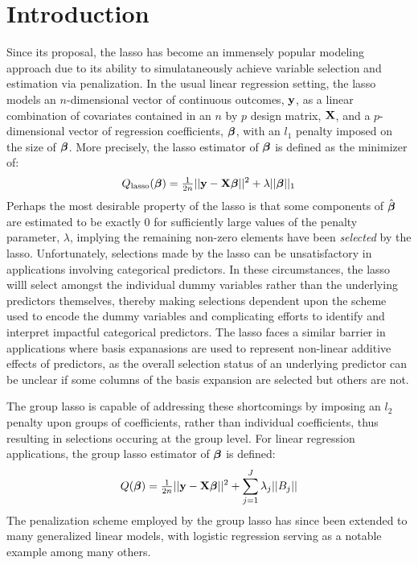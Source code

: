 \section{Introduction}

Since its proposal, the lasso \citep{tibshirani_1996} has become an immensely popular modeling approach due to its ability to simulataneously achieve variable selection and estimation via penalization. In the usual linear regression setting, the lasso models an $n$-dimensional vector of continuous outcomes, $\mathbf{y}$, as a linear combination of covariates contained in an $n$ by $p$ design matrix, $\mathbf{X}$, and a $p$-dimensional vector of regression coefficients, $\boldsymbol{\beta}$, with an $l_1$ penalty imposed on the size of $\boldsymbol{\beta}$. More precisely, the lasso estimator of $\boldsymbol{\beta}$ is defined as the minimizer of:
\begin{equation*}
Q_{\text{lasso}}(\boldsymbol{\beta}) = \tfrac{1}{2n}||\mathbf{y} - \mathbf{X}\boldsymbol{\beta}||^2 + \lambda||\boldsymbol{\beta}||_1
\end{equation*}
Perhaps the most desirable property of the lasso is that some components of $\hat{\boldsymbol{\beta}}$ are estimated to be exactly 0 for sufficiently large values of the penalty parameter, $\lambda$, implying the remaining non-zero elements have been \textit{selected} by the lasso.  Unfortunately, selections made by the lasso can be unsatisfactory in applications involving categorical predictors.  In these circumstances, the lasso willl select amongst the individual dummy variables rather than the underlying predictors themselves, thereby making selections dependent upon the scheme used to encode the dummy variables and complicating efforts to identify and interpret impactful categorical predictors.  The lasso faces a similar barrier in applications where basis expanasions are used to represent non-linear additive effects of predictors, as the overall selection status of an underlying predictor can be unclear if some columns of the basis expansion are selected but others are not.

The group lasso \citep{Yuan2006} is capable of addressing these shortcomings by imposing an $l_2$ penalty upon groups of coefficients, rather than individual coefficients, thus resulting in selections occuring at the group level.  For linear regression applications, the group lasso estimator of $\boldsymbol{\beta}$ is defined:
\begin{equation*}
Q(\boldsymbol{\beta}) = \tfrac{1}{2n}||\mathbf{y} - \mathbf{X}\boldsymbol{\beta}||^2 + \sum_{j = 1}^{J}\lambda_j ||B_j||
\end{equation*}
The penalization scheme employed by the group lasso has since been extended to many generalized linear models, with logistic regression \citep{meier2008} serving as a notable example among many others.

